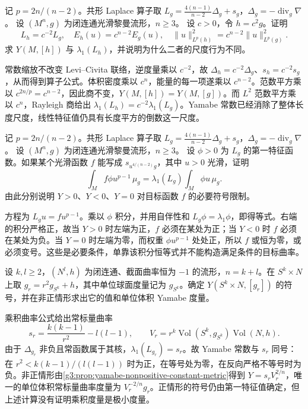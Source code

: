 \BookExercises

\begin{exercise}\label{g3:ex:yamabe-background-scaling}
	记 \(p=2n/(n-2)\)。共形 Laplace 算子取 \(L_g=\tfrac{4(n-1)}{n-2}\Delta_g+s_g\)，\(\Delta_g=-\operatorname{div}_g\nabla\)。
	设 \((M^n,g)\) 为闭连通光滑黎曼流形，\(n\ge3\)。
	设 \(c>0\)，令 \(h=c^2g\)。证明
	\[
		L_h=c^{-2}L_g,\quad E_h(u)=c^{n-2}E_g(u),\quad
		\|u\|_{L^p(h)}^2=c^{n-2}\|u\|_{L^p(g)}^2.
	\]
	求 \(Y(M,[h])\) 与 \(\lambda_1(L_h)\)，并说明为什么二者的尺度行为不同。
\end{exercise}
\begin{solution}
	常数缩放不改变 Levi--Civita 联络，逆度量乘以 \(c^{-2}\)，故 \(\Delta_h=c^{-2}\Delta_g\)、\(s_h=c^{-2}s_g\)，从而得到算子公式。体积密度乘以 \(c^n\)，能量的每一项遂乘以 \(c^{n-2}\)。范数平方乘以 \(c^{2n/p}=c^{n-2}\)，因此商不变，\(Y(M,[h])=Y(M,[g])\)。而 \(L^2\) 范数平方乘以 \(c^n\)，Rayleigh 商给出 \(\lambda_1(L_h)=c^{-2}\lambda_1(L_g)\)。Yamabe 常数已经消除了整体长度尺度，线性特征值仍具有长度平方的倒数这一尺度。
\end{solution}

\begin{exercise}\label{g3:ex:yamabe-prescribed-sign-obstruction}
	记 \(p=2n/(n-2)\)。共形 Laplace 算子取 \(L_g=\tfrac{4(n-1)}{n-2}\Delta_g+s_g\)，\(\Delta_g=-\operatorname{div}_g\nabla\)。
	设 \((M^n,g)\) 为闭连通光滑黎曼流形，\(n\ge3\)。
	设 \(\phi>0\) 为 \(L_g\) 的第一特征函数。如果某个光滑函数 \(f\) 能写成 \(s_{u^{4/(n-2)}g}\)，其中 \(u>0\) 光滑，证明
	\[
		\int_M f\phi u^{p-1}\,\mu_g=\lambda_1(L_g)\int_M\phi u\,\mu_g.
	\]
	由此分别说明 \(Y>0\)、\(Y<0\)、\(Y=0\) 对目标函数 \(f\) 的必要符号限制。
\end{exercise}
\begin{solution}
	方程为 \(L_gu=fu^{p-1}\)。乘以 \(\phi\) 积分，并用自伴性和 \(L_g\phi=\lambda_1\phi\)，即得等式。右端的积分严格正，故当 \(Y>0\) 时左端为正，\(f\) 必须在某处为正；当 \(Y<0\) 时 \(f\) 必须在某处为负。当 \(Y=0\) 时左端为零，而权重 \(\phi u^{p-1}\) 处处正，所以 \(f\) 或恒为零，或必须变号。这些是必要条件，单靠该积分恒等式并不能构造满足条件的目标曲率。
\end{solution}

\begin{exercise}\label{g3:ex:yamabe-product-sign-transition}
	设 \(k,l\ge2\)，\((N^l,h)\) 为闭连通、截面曲率恒为 \(-1\) 的流形，\(n=k+l\)。在 \(S^k\times N\) 上取
	\(g_r=r^2g_{S^k}+h\)，其中单位球面度量记为 \(g_{S^k}\)。确定 \(Y(S^k\times N,[g_r])\) 的符号，并在非正情形求出它的值和单位体积 Yamabe 度量。
\end{exercise}
\begin{solution}
	乘积曲率公式给出常标量曲率
	\[
		s_r=\frac{k(k-1)}{r^2}-l(l-1),\qquad
		V_r=r^k\operatorname{Vol}(S^k,g_{S^k})\operatorname{Vol}(N,h).
	\]
	由于 \(\Delta_{g_r}\) 非负且常函数属于其核，\(\lambda_1(L_{g_r})=s_r\)。故 Yamabe 常数与 \(s_r\) 同号：在 \(r^2<k(k-1)/(l(l-1))\) 时为正，在等号处为零，在反向严格不等号时为负。非正情形由\cref{g3:prop:yamabe-nonpositive-constant-metric}得到 \(Y=s_rV_r^{2/n}\)，唯一的单位体积常标量曲率度量为 \(V_r^{-2/n}g_r\)。正情形的符号仍由第一特征值确定，但上述计算没有证明乘积度量是极小度量。
\end{solution}

